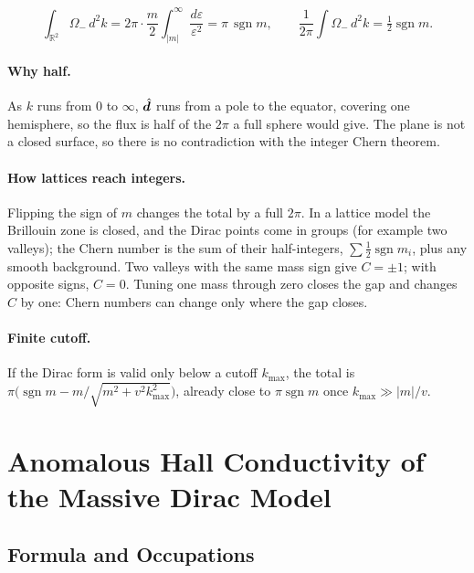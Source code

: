 \begin{theorem}
\[
    \int_{\mathbb{R}^2}\Omega_-\,d^2k = 2\pi\cdot\frac m2\int_{|m|}^\infty\frac{d\varepsilon}{\varepsilon^2} = \pi\,\operatorname{sgn}m,
    \qquad
    \frac{1}{2\pi}\int\Omega_-\,d^2k = \tfrac12\operatorname{sgn}m .
\]
\end{theorem}

\paragraph{Why half.} As $k$ runs from $0$ to $\infty$, $\hat{\bm{d}}$ runs from a pole to the equator, covering one hemisphere, so the flux is half of the $2\pi$ a full sphere would give. The plane is not a closed surface, so there is no contradiction with the integer Chern theorem.

\paragraph{How lattices reach integers.} Flipping the sign of $m$ changes the total by a full $2\pi$. In a lattice model the Brillouin zone is closed, and the Dirac points come in groups (for example two valleys); the Chern number is the sum of their half-integers, $\sum\frac12\operatorname{sgn}m_i$, plus any smooth background. Two valleys with the same mass sign give $C = \pm1$; with opposite signs, $C = 0$. Tuning one mass through zero closes the gap and changes $C$ by one: Chern numbers can change only where the gap closes.

\paragraph{Finite cutoff.} If the Dirac form is valid only below a cutoff $k_{\max}$, the total is $\pi\bigl(\operatorname{sgn}m - m/\sqrt{m^2+v^2k_{\max}^2}\bigr)$, already close to $\pi\operatorname{sgn}m$ once $k_{\max}\gg|m|/v$.

\section{Anomalous Hall Conductivity of the Massive Dirac Model}
\label{sec:anomalous-hall}

\subsection{Formula and Occupations}

